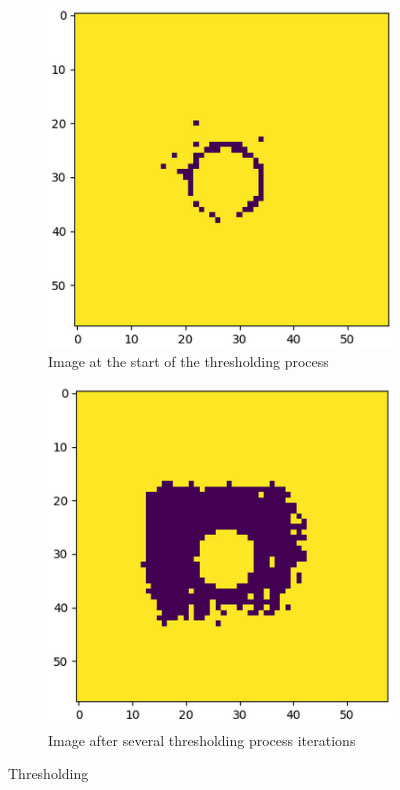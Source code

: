 \begin{enumerate}
    \begin{figure}[H]
        \centering
        \begin{subfigure}[b]{0.40\textwidth}
            \includegraphics[width=\textwidth]{Content/Images/bb_find_algo_thresholding_low.png}
            \caption{Image at the start of the thresholding process}
        \end{subfigure}
        \begin{subfigure}[b]{0.40\textwidth}
            \includegraphics[width=\textwidth]{Content/Images/bb_find_algo_thresholding_high.png}
            \caption{Image after several thresholding process iterations}
        \end{subfigure}
        \caption{Thresholding \cite{pylinac_images}}
    \end{figure}
    

\end{enumerate}
